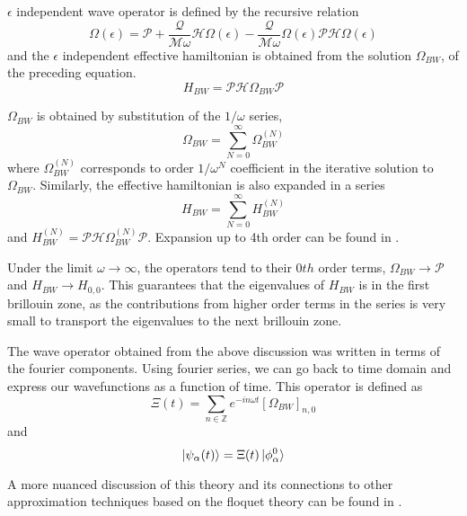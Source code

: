 $\epsilon$ independent wave operator is defined by the recursive relation
\begin{equation}
 \label{chap_5:omegabw}\Omega(\epsilon) = \mathcal{P} + \frac{\mathcal{Q}}{\mathcal{M}\omega}\mathcal{H}\Omega(\epsilon) - \frac{\mathcal{Q}}{\mathcal{M}\omega}\Omega(\epsilon)\mathcal{P}\mathcal{H}\Omega(\epsilon)
\end{equation} and the $\epsilon$ independent effective hamiltonian is obtained from the solution $\Omega_{BW}$, of the preceding equation.
\begin{equation}
 H_{BW} = \mathcal{P}\mathcal{H}\Omega_{BW}\mathcal{P}
\end{equation}

$\Omega_{BW}$ is obtained by substitution of the $1/\omega$ series, 
\begin{equation*}
 \Omega_{BW} = \sum_{N=0}^{\infty}{\Omega_{BW}^{(N)}}
\end{equation*} where $\Omega_{BW}^{(N)}$ corresponds to order $1/\omega^N$ coefficient in the iterative solution to $\Omega_{BW}$. Similarly, the effective hamiltonian
is also expanded in a series \begin{equation*}
 H_{BW} = \sum_{N=0}^{\infty}{H_{BW}^{(N)}}
\end{equation*} and $H_{BW}^{(N)} = \mathcal{P}\mathcal{H}\Omega_{BW}^{(N)}\mathcal{P}$. Expansion up to 4th order can be found in \parencite{mikami2016brillouin}.

Under the limit $\omega \rightarrow \infty$, the operators tend to their $0th$ order terms, $\Omega_{BW} \rightarrow \mathcal{P}$ and $H_{BW} \rightarrow H_{0,0}$. This guarantees that the eigenvalues of 
$H_{BW}$ is in the first brillouin zone, as the contributions from higher order terms in the series is very small to transport the eigenvalues to the next brillouin zone.

The wave operator obtained from the above discussion was written in terms of the fourier components. Using fourier series, we can go back to time domain and express our 
wavefunctions as a function of time. This operator is defined as
\begin{equation}
 \Xi(t) = \sum_{n\in\mathbb{Z}}{e^{-in\omega t}[\Omega_{BW}]_{n,0}}
\end{equation}
and
\begin{equation}
 \ket{\psi_{\alpha}(t)} = \Xi(t)\ket{\phi_\alpha^0}
\end{equation}

A more nuanced discussion of this theory and its connections to other approximation techniques based on the floquet theory can be found in \parencite{mikami2016brillouin}.
